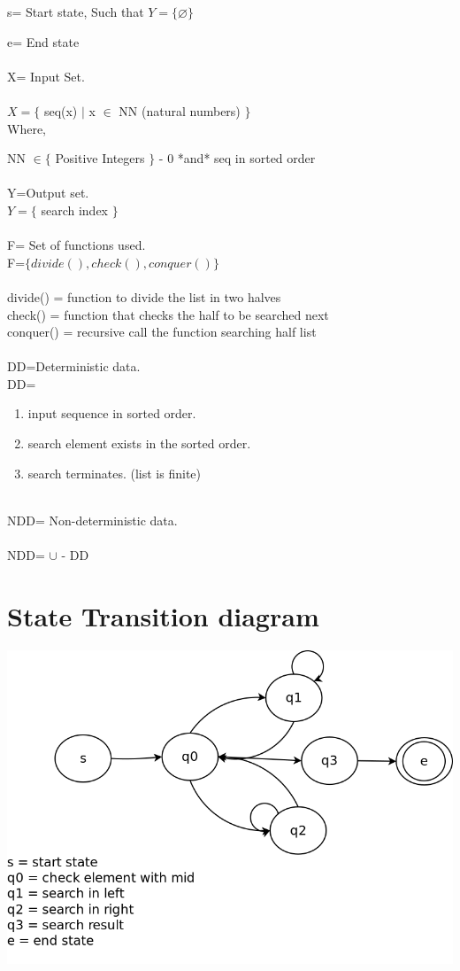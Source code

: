 \documentclass[10pt,a4paper]{article}
\begin{document}
s= Start state,  Such that $Y=\lbrace \varnothing \rbrace$ 

e= End state  \\\\
X= Input Set. \\\\
$X=\lbrace$ seq(x) $\mid$ x $\in$ NN (natural numbers) $\rbrace$ \\
Where,

NN $\in \lbrace$ Positive Integers $\rbrace$ - 0 *and* seq in sorted order\\\\ 
Y=Output set.\\
$Y=\lbrace$ search index $\rbrace $ \\\\
F= Set of functions used.\\
F=$\lbrace divide(), check(), conquer() \rbrace$ \\\\
divide() = function to divide the list in two halves\\
check() = function that checks the half to be searched next\\
conquer() = recursive call the function searching half list\\\\
DD=Deterministic data. \\
DD=
\begin{enumerate}
\item input sequence in sorted order.
\item search element exists in the sorted order.
\item search terminates. (list is finite)\\\\
\end{enumerate}
NDD= Non-deterministic data. \\
\\NDD= $\cup$ - DD\\


\section{State Transition diagram}
\includegraphics[scale=0.35]{stdg.png}
\end{document}
